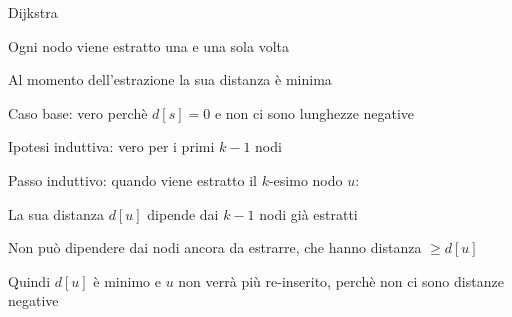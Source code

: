 \begin{frame}{Dijkstra}

\begin{myboxtitle}
\BIL 
\item Ogni nodo viene estratto una e una sola volta
\item Al momento dell'estrazione la sua distanza è minima    
\EIL
\end{myboxtitle}


\BIL
\item Caso base: vero perchè $d[s]=0$ e non ci sono lunghezze negative
\item Ipotesi induttiva: vero per i primi $k-1$ nodi
\item Passo induttivo: quando viene estratto il $k$-esimo nodo $u$:
  \BI
  \item La sua distanza $d[u]$ dipende dai $k-1$ nodi già estratti
  \item Non può dipendere dai nodi ancora da estrarre, che hanno distanza $\geq d[u]$
  \item Quindi $d[u]$ è minimo e $u$ non verrà più re-inserito, perchè non ci sono distanze negative
\EI
\EIL

\end{frame}


